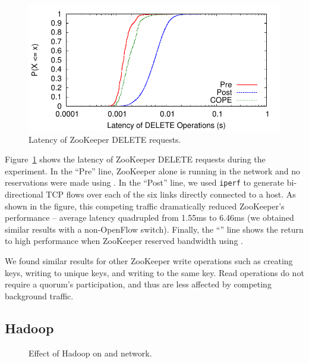 \begin{figure}[t]
\centering
\includegraphics[width=\columnwidth]{figs/DELETE-zk-latencies-logscale}
\caption{Latency of ZooKeeper DELETE requests.}
\label{fig:ZooKeeperDELETE}
\end{figure}

Figure~\ref{fig:ZooKeeperDELETE} shows the latency of ZooKeeper DELETE requests 
during the experiment. In the ``Pre'' line, ZooKeeper alone is running in the 
network and no reservations were made using \sys. In the ``Post'' line, we used 
\verb/iperf/ to generate bi-directional TCP flows over each of the six links 
directly connected to a host.
As shown in the 
figure, this competing traffic dramatically reduced ZooKeeper's performance -- 
average latency quadrupled from 1.55ms to 6.46ms (we obtained
similar results with a non-OpenFlow switch). Finally, the ``\sys'' line shows 
the return to high performance when ZooKeeper reserved bandwidth using \sys.

We found similar results for other ZooKeeper write operations such as creating 
keys, writing to unique keys, and writing to the same key. Read operations do 
not require a quorum's participation, and thus are less affected by competing background 
traffic.

\subsection{Hadoop}

\begin{figure}[t]
\centering
{}
\caption{Effect of Hadoop on \sys and network.}
\label{fig:HadoopResvs}
\end{figure}

